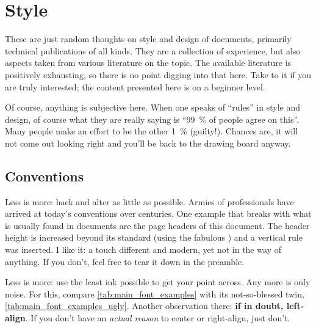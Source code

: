 \chapter{Style}

These are just random thoughts on style and design of documents, primarily technical publications of all kinds.
They are a collection of experience, but also aspects taken from various literature on the topic.
The available literature is positively exhausting, so there is no point digging into that here.
Take to it if you are truly interested; the content presented here is on a beginner level.

Of course, anything is subjective here.
When one speaks of \enquote{rules} in style and design, of course what they are really saying is \enquote{\SI{99}{\percent} of people agree on this}.
Many people make an effort to be the other \SI{1}{\percent} (guilty!).
Chances are, it will not come out looking right and you'll be back to the drawing board anyway.

\section{Conventions}
Less is more: hack and alter as little as possible.
Armies of professionals have arrived at today's conventions over centuries.
One example that breaks with what is usually found in documents are the page headers of this document.
The header height is increased beyond its standard (using the fabulous ) and a vertical rule was inserted.
I like it: a touch different and modern, yet not in the way of anything.
If you don't, feel free to tear it down in the preamble.

Less is more: use the least ink possible to get your point across.
Any more is only noise.
For this, compare \cref{tab:main_font_examples} with its not-so-blessed twin, \cref{tab:main_font_examples_ugly}.
Another observation there: \textbf{if in doubt, left-align}.
If you don't have an \emph{actual reason} to center or right-align, just don't.

